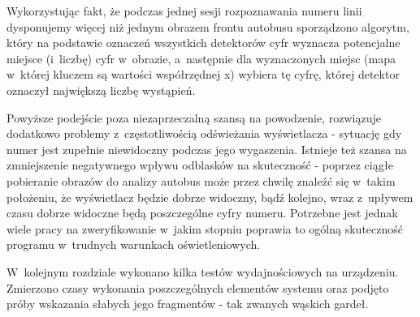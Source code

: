 Wykorzystując fakt, że podczas jednej sesji rozpoznawania numeru 
linii dysponujemy więcej niż jednym obrazem frontu autobusu 
sporządzono algorytm, który na podstawie oznaczeń wszystkich
detektorów cyfr wyznacza potencjalne miejsce (i~liczbę) cyfr
w~obrazie, a~następnie dla wyznaczonych miejsc (mapa w~której kluczem 
są wartości współrzędnej x) wybiera tę cyfrę, której detektor oznaczył 
największą liczbę wystąpień.

Powyższe podejście poza niezaprzeczalną szansą na powodzenie, 
 rozwiązuje dodatkowo problemy z~częstotliwością odświeżania
wyświetlacza - sytuację gdy numer jest zupełnie niewidoczny podczas
jego wygaszenia. Istnieje też szansa na zmniejszenie negatywnego
wpływu odblasków na skuteczność - 
poprzez ciągłe pobieranie obrazów do analizy autobus może przez 
chwilę znaleźć się w~takim położeniu, że wyświetlacz będzie dobrze widoczny, bądź
kolejno, wraz z~upływem czasu dobrze widoczne będą poszczególne cyfry numeru.
Potrzebne jest jednak wiele pracy na zweryfikowanie w~jakim stopniu poprawia
to ogólną skuteczność programu w~trudnych warunkach oświetleniowych.

W~kolejnym rozdziale wykonano kilka testów wydajnościowych
na urządzeniu. Zmierzono czasy wykonania poszczególnych elementów 
systemu oraz podjęto próby wskazania słabych jego fragmentów -
tak zwanych wąskich gardeł.